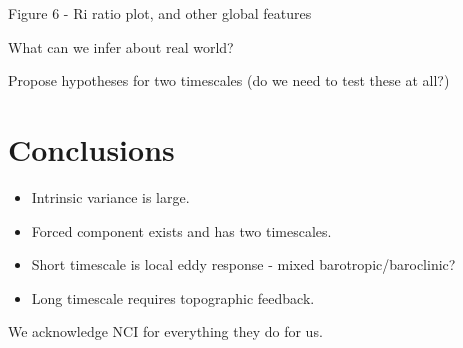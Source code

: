 \documentclass{agujournal2019}
\begin{document}
Figure 6 - Ri ratio plot, and other global features


What can we infer about real world?

Propose hypotheses for two timescales (do we need to test these at all?)



\section{Conclusions}
\begin{itemize}
    \item Intrinsic variance is large.
    \item  Forced component exists and has two timescales.
    \item Short timescale is local eddy response - mixed  barotropic/baroclinic?
    \item Long timescale requires topographic feedback.

\end{itemize}



\acknowledgments
We acknowledge NCI for everything they do for us.


\end{document}
